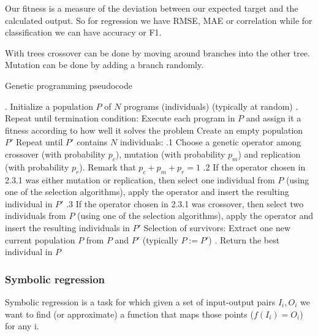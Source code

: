 \vspace{10pt}

Our fitness is a measure of the deviation between our expected target and the calculated output. So for regression we have RMSE, MAE or correlation while for classification we can have accuracy or F1. 

\vspace{10pt}

With trees crossover can be done by moving around branches into the other tree. Mutation can be done by adding a branch randomly. 

\vspace{10pt}

Genetic programming pseudocode


\begin{algorithm}
\caption{Genetic Programming Algorithm}
\begin{algorithmic}[1]
. Initialize a population $P$ of $N$ programs (individuals) (typically at random)
. Repeat until termination condition:
 Execute each program in $P$ and assign it a fitness according to how well it solves the problem
 Create an empty population $P'$
 Repeat until $P'$ contains $N$ individuals:
.1 Choose a genetic operator among crossover (with probability $p_c$), mutation (with probability $p_m$) and replication (with probability $p_r$). Remark that $p_c + p_m + p_r = 1$
.2 If the operator chosen in 2.3.1 was either mutation or replication, then select one individual from $P$ (using one of the selection algorithms), apply the operator and insert the resulting individual in $P'$
.3 If the operator chosen in 2.3.1 was crossover, then select two individuals from $P$ (using one of the selection algorithms), apply the operator and insert the resulting individuals in $P'$
 Selection of survivors: Extract one new current population $P$ from $P$ and $P'$ (typically $P := P'$)
. Return the best individual in $P$
\end{algorithmic}
\end{algorithm}
\subsubsection{Symbolic regression}

Symbolic regression is a task for which given a set of input-output pairs ${I_i, O_i}$ we want to find (or approximate) a function that maps those points ($f(I_i) = O_i$) for any i.  

